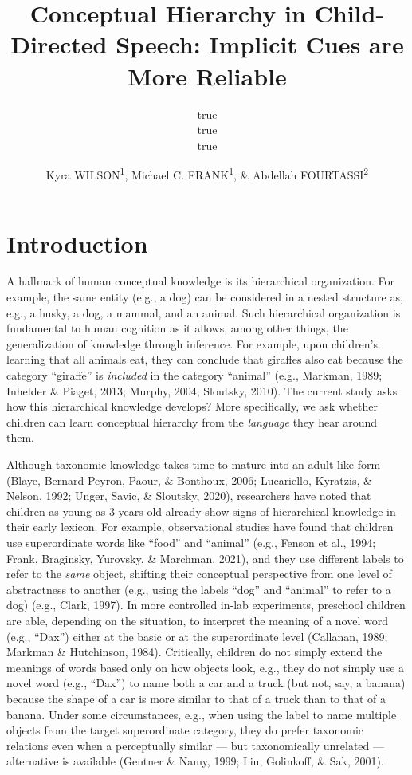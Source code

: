 \documentclass[english,,man]{apa6}
\title{Conceptual Hierarchy in Child-Directed Speech: Implicit Cues are More Reliable}
\author{true \\ true \\ true}
\date{}
\author{Kyra WILSON\textsuperscript{1}, Michael C. FRANK\textsuperscript{1}, \& Abdellah FOURTASSI\textsuperscript{2}}
\affiliation{
\vspace{0.5cm}
\textsuperscript{1} Department of Psychology, Stanford University\\\textsuperscript{2} Department of Computer Science, Aix-Marseille University}
\begin{document}
\maketitle

\hypertarget{introduction}{%
\section{Introduction}\label{introduction}}

A hallmark of human conceptual knowledge is its hierarchical organization. For example, the same entity (e.g., a dog) can be considered in a nested structure as, e.g., a husky, a dog, a mammal, and an animal. Such hierarchical organization is fundamental to human cognition as it allows, among other things, the generalization of knowledge through inference. For example, upon children's learning that all animals eat, they can conclude that giraffes also eat because the category \enquote{giraffe} is \emph{included} in the category \enquote{animal} (e.g., Markman, 1989; Inhelder \& Piaget, 2013; Murphy, 2004; Sloutsky, 2010). The current study asks how this hierarchical knowledge develops? More specifically, we ask whether children can learn conceptual hierarchy from the \emph{language} they hear around them.

Although taxonomic knowledge takes time to mature into an adult-like form (Blaye, Bernard-Peyron, Paour, \& Bonthoux, 2006; Lucariello, Kyratzis, \& Nelson, 1992; Unger, Savic, \& Sloutsky, 2020), researchers have noted that children as young as 3 years old already show signs of hierarchical knowledge in their early lexicon. For example, observational studies have found that children use superordinate words like \enquote{food} and \enquote{animal} (e.g., Fenson et al., 1994; Frank, Braginsky, Yurovsky, \& Marchman, 2021), and they use different labels to refer to the \emph{same} object, shifting their conceptual perspective from one level of abstractness to another (e.g., using the labels \enquote{dog} and \enquote{animal} to refer to a dog) (e.g., Clark, 1997). In more controlled in-lab experiments, preschool children are able, depending on the situation, to interpret the meaning of a novel word (e.g., \enquote{Dax}) either at the basic or at the superordinate level (Callanan, 1989; Markman \& Hutchinson, 1984). Critically, children do not simply extend the meanings of words based only on how objects look, e.g., they do not simply use a novel word (e.g., \enquote{Dax}) to name both a car and a truck (but not, say, a banana) because the shape of a car is more similar to that of a truck than to that of a banana. Under some circumstances, e.g., when using the label to name multiple objects from the target superordinate category, they do prefer taxonomic relations even when a perceptually similar --- but taxonomically unrelated --- alternative is available (Gentner \& Namy, 1999; Liu, Golinkoff, \& Sak, 2001).
\end{document}
